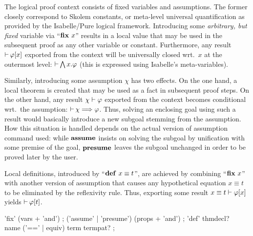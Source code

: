 The logical proof context consists of fixed variables and assumptions.  The
former closely correspond to Skolem constants, or meta-level universal
quantification as provided by the Isabelle/Pure logical framework.
Introducing some \emph{arbitrary, but fixed} variable via ``${\mathord{\mathbf{fix}}}~x$'' results
in a local value that may be used in the subsequent proof as any other
variable or constant.  Furthermore, any result $\mathop{\mathrel{\vdash}}\nolimits \varphi[x]$ exported from
the context will be universally closed wrt.\ $x$ at the outermost level:
$\mathop{\mathrel{\vdash}}\nolimits \bigwedge x. \varphi$ (this is expressed using Isabelle's meta-variables).

Similarly, introducing some assumption $\chi$ has two effects.  On the one
hand, a local theorem is created that may be used as a fact in subsequent
proof steps.  On the other hand, any result $\chi \mathrel{\vdash} \varphi$ exported from the
context becomes conditional wrt.\ the assumption: $\mathop{\mathrel{\vdash}}\nolimits \chi \Longrightarrow \varphi$.
Thus, solving an enclosing goal using such a result would basically introduce
a new subgoal stemming from the assumption.  How this situation is handled
depends on the actual version of assumption command used: while ${\mathord{\mathbf{assume}}}$
insists on solving the subgoal by unification with some premise of the goal,
${\mathord{\mathbf{presume}}}$ leaves the subgoal unchanged in order to be proved later by the
user.

Local definitions, introduced by ``$\DEF{}{x \equiv t}$'', are achieved by
combining ``${\mathord{\mathbf{fix}}}~x$'' with another version of assumption that causes any
hypothetical equation $x \equiv t$ to be eliminated by the reflexivity rule.
Thus, exporting some result $x \equiv t \mathrel{\vdash} \varphi[x]$ yields $\mathop{\mathrel{\vdash}}\nolimits \varphi[t]$.


\begin{rail}
  'fix' (vars + 'and')
  ;
  ('assume' | 'presume') (props + 'and')
  ;
  'def' thmdecl? \\ name ('==' | equiv) term termpat?
  ;
\end{rail}

